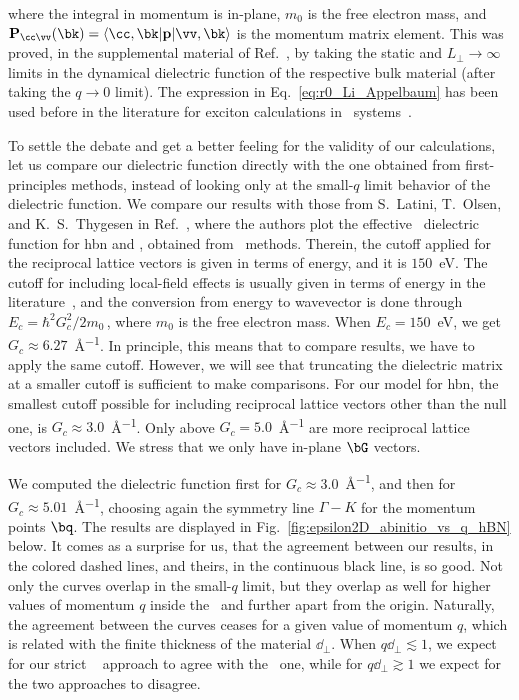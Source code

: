 \noindent where the integral in momentum is in-plane, $m_0$ is the free electron mass, and $\mathbf{P}_{\cc \vv}(\bk) = \langle \cc, \bk |\mathbf{p}| \vv, \bk \rangle$ is the momentum matrix element.
This was proved, in the supplemental material of Ref.~\cite{Li_Appelbaum_2019}, by taking the static and $L_{\perp} \to \infty$ limits in the dynamical dielectric function of the respective bulk material (after taking the $q \to 0$ limit).
The expression in Eq.~\eqref{eq:r0_Li_Appelbaum} has been used before in the literature for exciton calculations in \bd~systems~\cite{Mauricio_2024}.

To settle the debate and get a better feeling for the validity of our calculations, let us compare our dielectric function directly with the one obtained from first-principles methods, instead of looking only at the small-$q$ limit behavior of the dielectric function.
We compare our results with those from S.~Latini, T.~Olsen, and K.~S.~Thygesen in Ref.~\cite{Latini_2015}, where the authors plot the effective \bd~dielectric function for \gls{hbn} and , obtained from \abinit~methods.
Therein, the cutoff applied for the reciprocal lattice vectors is given in terms of energy, and it is $150$~\unit{\electronvolt}.
The cutoff for including local-field effects is usually given in terms of energy in the literature~\cite{BerkeleyGW,Latini_2015,Guandalini_Varsano_2023}, and the conversion from energy to wavevector is done through $E_c = \hbar^2 G_c^2/2 m_0$\,, where $m_0$ is the free electron mass.
When $E_c = 150$~\unit{\electronvolt}, we get $G_c \approx 6.27$~\unit{\angstrom^{-1}}.
In principle, this means that to compare results, we have to apply the same cutoff.
However, we will see that truncating the dielectric matrix at a smaller cutoff is sufficient to make comparisons.
For our model for \gls{hbn}, the smallest cutoff possible for including reciprocal lattice vectors other than the null one, is $G_c \approx 3.0$~\unit{\angstrom^{-1}}.
Only above $G_c = 5.0$~\unit{\angstrom^{-1}} are more reciprocal lattice vectors included.
We stress that we only have in-plane $\bG$ vectors.

We computed the dielectric function first for $G_c \approx 3.0$~\unit{\angstrom^{-1}}, and then for $G_c \approx 5.01$~\unit{\angstrom^{-1}}, choosing again the symmetry line $\Gamma-K$ for the momentum points $\bq$.
The results are displayed in Fig.~\ref{fig:epsilon2D_abinitio_vs_q_hBN} below.
It comes as a surprise for us, that the agreement between our results, in the colored dashed lines, and theirs, in the continuous black line, is so good.
Not only the curves overlap in the small-$q$ limit, but they overlap as well for higher values of momentum $q$ inside the \bz~and further apart from the origin.
Naturally, the agreement between the curves ceases for a given value of momentum $q$, which is related with the finite thickness of the material $\dd_{\perp}$.
When $q \dd_{\perp} \lesssim 1$, we expect for our strict \bd~ approach to agree with the \abinit~one, while for $q \dd_{\perp}  \gtrsim 1$ we expect for the two approaches to disagree.

